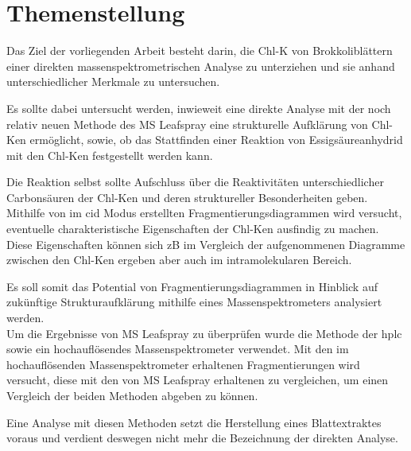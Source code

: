 \chapter{Themenstellung}

Das Ziel der vorliegenden Arbeit besteht darin, die \gls{Chl-K} von Brokkoliblättern einer direkten massenspektrometrischen Analyse zu unterziehen und sie anhand unterschiedlicher Merkmale zu untersuchen.

Es sollte dabei untersucht werden, inwieweit eine direkte Analyse mit der noch relativ neuen Methode des MS Leafspray eine strukturelle Aufklärung von \gls{Chl-K}en ermöglicht, sowie, ob das Stattfinden einer Reaktion von Essigsäureanhydrid mit den \gls{Chl-K}en festgestellt werden kann. 

Die Reaktion selbst sollte Aufschluss über die Reaktivitäten unterschiedlicher Carbonsäuren der \gls{Chl-K}en und deren struktureller Besonderheiten geben. \\

Mithilfe von im \gls{cid} Modus erstellten Fragmentierungsdiagrammen wird versucht, eventuelle charakteristische Eigenschaften der \gls{Chl-K}en ausfindig zu machen. Diese Eigenschaften können sich \gls{zB} im Vergleich der aufgenommenen Diagramme zwischen den \gls{Chl-K}en ergeben aber auch im intramolekularen Bereich. 

Es soll somit das Potential von Fragmentierungsdiagrammen in Hinblick auf zukünftige Strukturaufklärung mithilfe eines Massenspektrometers analysiert werden. \\

Um die Ergebnisse von MS Leafspray zu überprüfen wurde die Methode der \gls{hplc} sowie ein hochauflösendes Massenspektrometer verwendet. Mit den im hochauflösenden Massenspektrometer erhaltenen Fragmentierungen wird versucht, diese mit den von MS Leafspray erhaltenen zu vergleichen, um einen Vergleich der beiden Methoden abgeben zu können.

Eine Analyse mit diesen Methoden setzt die Herstellung eines Blattextraktes voraus und verdient deswegen nicht mehr die Bezeichnung der direkten Analyse.




